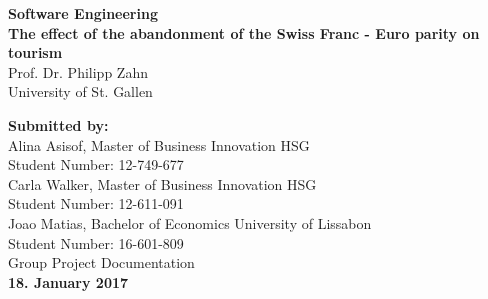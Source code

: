 \documentclass[12pt,a4paper,bibliography=totocnumbered,listof=totocnumbered]{scrartcl}
\begin{document}

\renewcommand{\sectionmark}[1]{\markright{#1}}
\renewcommand{\leftmark}{\rightmark}
\pagestyle{fancy}
\lhead{ }
\chead{ }
\rhead{\thesection\space\contentsname}
\cfoot{ }
\renewcommand{\headrulewidth}{0.4pt}
\renewcommand{\footrulewidth}{0.4pt}

\renewcommand{\thesection}{\Roman{section}}
\renewcommand{\theHsection}{\Roman{section}}

\thispagestyle{empty}
\begin{center}
	
	\vspace*{2cm}
	\Huge
	\textbf{Software Engineering}\\
\vfill
	\Large
	\textbf{The effect of the abandonment of the Swiss Franc - Euro parity on tourism}\\
\vfill
	\Large
	{Prof. Dr. Philipp Zahn}\\
	\Large
	University of St. Gallen
	
\vfill


\end{center}

\begin{flushleft}	
	\vfill
	\normalsize
\textbf{Submitted by:} \\
Alina Asisof, Master of Business Innovation HSG\\
Student Number: 12-749-677\\ 
Carla Walker, Master of Business Innovation HSG\\ 
Student Number: 12-611-091\\ 

Joao Matias, Bachelor of Economics University of Lissabon\\ 
Student Number: 16-601-809\\ 
\vfill
Group Project Documentation\\ 
 
\vfill
\textbf{18. January 2017}

\end{flushleft}	
\end{document}
